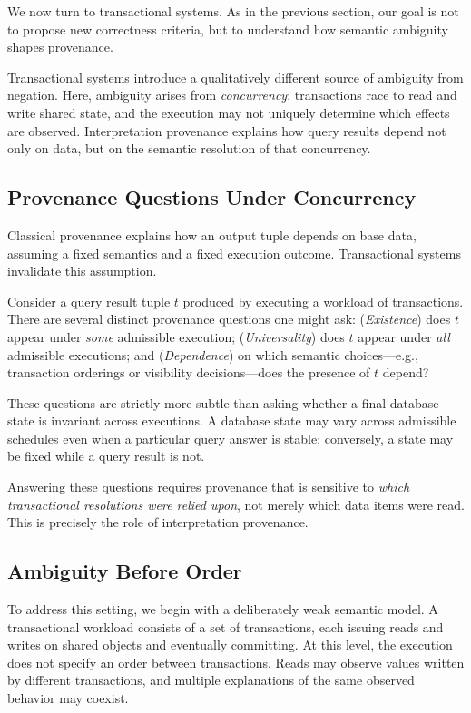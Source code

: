 \documentclass[acmsmall,nonacm]{acmart}
\theoremstyle{remark}
\numberwithin{definition}{section}
\numberwithin{theorem}{section}
\numberwithin{lemma}{section}
\numberwithin{corollary}{section}
\numberwithin{remark}{section}
\numberwithin{example}{section}
\numberwithin{observation}{section}
\numberwithin{assumption}{section}
\begin{document}
We now turn to transactional systems.
As in the previous section, our goal is not to propose new correctness criteria,
but to understand how semantic ambiguity shapes provenance.

Transactional systems introduce a qualitatively different source of ambiguity
from negation.
Here, ambiguity arises from \emph{concurrency}: transactions race to read and write
shared state, and the execution may not uniquely determine which effects are
observed.
Interpretation provenance explains how query results depend not only on data, but
on the semantic resolution of that concurrency.

\subsection{Provenance Questions Under Concurrency}

Classical provenance explains how an output tuple depends on base data, assuming a
fixed semantics and a fixed execution outcome.
Transactional systems invalidate this assumption.

Consider a query result tuple $t$ produced by executing a workload of
transactions.
There are several distinct provenance questions one might ask: (\emph{Existence})
does $t$ appear under \emph{some} admissible execution; (\emph{Universality}) does
$t$ appear under \emph{all}
admissible executions; and (\emph{Dependence}) on which semantic choices---e.g.,
transaction orderings or visibility decisions---does the presence of $t$ depend?

These questions are strictly more subtle than asking whether a final database
state is invariant across executions.
A database state may vary across admissible schedules even when a particular
query answer is stable; conversely, a state may be fixed while a query result is
not.

Answering these questions requires provenance that is sensitive to
\emph{which transactional resolutions were relied upon}, not merely which data
items were read.
This is precisely the role of interpretation provenance.

\subsection{Ambiguity Before Order}

To address this setting, we begin with a deliberately
weak semantic model.
A transactional workload consists of a set of transactions, each issuing reads
and writes on shared objects and eventually committing.
At this level, the execution does not specify an order between transactions.
Reads may observe values written by different transactions, and multiple
explanations of the same observed behavior may coexist.
\end{document}
